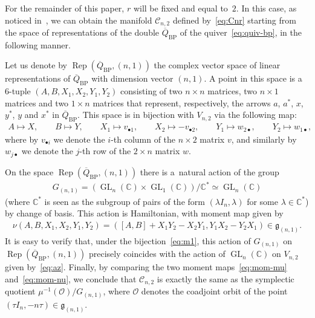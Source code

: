 \documentclass[pdftex]{sigma}
\newcommand{\bb}[1]{\mathbb{#1}}
\newcommand{\ol}[1]{\overline{#1}}
\DeclareMathOperator{\GL}{GL}
\DeclareMathOperator{\Rep}{Rep}
\begin{document}
For the remainder of this paper, \(r\) will be f\/ixed and equal to~\(2\).
In this case, as noticed in~\cite{bp08}, we can obtain the manifold \(\mathcal{C}_{n,2}\) def\/ined
by~\eqref{eq:Cnr} starting from the space of representations of the double \(\ol{Q}_{\mathrm{BP}}\) of the
quiver~\eqref{eq:quiv-bp}, in the following manner.

Let us denote by \(\Rep(\ol{Q}_{\mathrm{BP}},(n,1))\) the complex vector space of linear representations of
\(\ol{Q}_{\mathrm{BP}}\) with dimension vector \((n,1)\).
A point in this space is a~\(6\)-tuple \((A,B,X_{1},X_{2},Y_{1},Y_{2})\) consisting of two \(n\times n\)
matrices, two \(n\times 1\) matrices and two \(1\times n\) matrices that represent, respectively, the
arrows \(a\), \(a^{*}\), \(x\), \(y^{*}\), \(y\) and \(x^{*}\) in \(\ol{Q}_{\mathrm{BP}}\).
This space is in bijection with \(V_{n,2}\) via the following map:
\begin{gather}
\label{eq:m1}
A\mapsto X,
\qquad
B\mapsto Y,
\qquad
X_{1}\mapsto v_{\bullet1},
\qquad
X_{2}\mapsto-v_{\bullet2},
\qquad
Y_{1}\mapsto w_{2\bullet},
\qquad
Y_{2}\mapsto w_{1\bullet},
\end{gather}
where by \(v_{\bullet i}\) we denote the \(i\)-th column of the \(n\times 2\) matrix \(v\), and similarly
by \(w_{j\bullet}\) we denote the \(j\)-th row of the \(2\times n\) matrix \(w\).

On the space \(\Rep(\ol{Q}_{\mathrm{BP}},(n,1))\) there is a~natural action of the group
\begin{gather*}
G_{(n,1)}=(\GL_{n}(\bb{C})\times\GL_{1}(\bb{C}))/\bb{C}^{*}\simeq\GL_{n}(\bb{C})
\end{gather*}
(where \(\bb{C}^{*}\) is seen as the subgroup of pairs of the form \((\lambda I_{n},\lambda)\) for some
\(\lambda\in \bb{C}^{*}\)) by change of basis.
This action is Hamiltonian, with moment map given by
\begin{gather}
\label{eq:mom-nu}
\nu(A,B,X_{1},X_{2},Y_{1},Y_{2})=([A,B]+X_{1}Y_{2}-X_{2}Y_{1},Y_{1}X_{2}-Y_{2}X_{1})\in\mathfrak{g}_{(n,1)}.
\end{gather}
It is easy to verify that, under the bijection~\eqref{eq:m1}, this action of \(G_{(n,1)}\) on
\(\Rep(\ol{Q}_{\mathrm{BP}},(n,1))\) precisely coincides with the action of \(\GL_{n}(\bb{C})\) on
\(V_{n,2}\) given by~\eqref{eq:az}.
Finally, by comparing the two moment maps~\eqref{eq:mom-mu} and~\eqref{eq:mom-nu}, we conclude that
\(\mathcal{C}_{n,2}\) is exactly the same as the symplectic quotient \(\mu^{-1}(\mathcal{O})/G_{(n,1)}\),
where \(\mathcal{O}\) denotes the coadjoint orbit of the point \((\tau I_{n}, -n\tau)\in
\mathfrak{g}_{(n,1)}\).
\end{document}
